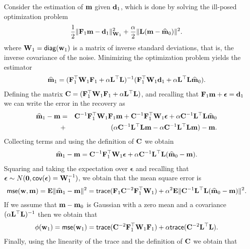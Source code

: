 \documentclass[english]{siamltex}
\newcommand{\bfC}	{{\bf{C}}}
\newcommand{\bfE}	{{\bf{E}}}
\newcommand{\bfF}	{{\bf{F}}}
\newcommand{\bfL}	{{\bf{L}}}
\newcommand{\bfW}	{{\bf{W}}}
\newcommand{\bfd}	{{\bf{d}}}
\newcommand{\bfm}	{{\bf{m}}}
\newcommand{\bfw}	{{\bf{w}}}
\newcommand{\hf}        {{\frac 12}}
\newcommand{\bfepsilon} {{\boldsymbol \epsilon}}
\newcommand{\bfmhat}    {{\widehat{\bfm}}}
\newcommand{\LtL}       { \bfL^{\top}\bfL}
\newcommand {\zero}  { {\bf 0} }
\renewcommand{\hf}		 {\frac12}
\renewcommand{\bfmhat}	{\widehat{\bf m}}
\begin{document}
{Consider  the estimation of $\bfm$ given $\bfd_{1}$, which is done by solving the ill-posed optimization problem
\begin{eqnarray}
\label{mest1}
\hf \| \bfF_{1} \bfm - \bfd_{1}\|^{2}_{\bfW_{1}} + {\frac {\alpha} 2}
\|\bfL (\bfm - \bfmhat_{0}) \|^{2}. 
\end{eqnarray}
where $\bfW_{1} = {\sf diag}(\bfw_{1})$ is a matrix of inverse standard deviations, 
that is, the inverse covariance of the noise.
Minimizing the  optimization problem yields the estimator
\begin{eqnarray}
\label{mest}
\widehat \bfm_{1} = (\bfF_{1}^{\top} \bfW_{1}\bfF_{1} + \alpha \bfL^{\top} \bfL)^{-1} (\bfF_{1}^{\top} \bfW_{1} \bfd_{1}
+ \alpha \LtL \bfmhat_{0}).
\end{eqnarray}
Defining the matrix $\bfC = (\bfF_{1}^{\top} \bfW_{1}\bfF_{1} + \alpha \LtL)$, and recalling that $\bfF_1\bfm + \bfepsilon = \bfd_1$ we can write
the error in the recovery as
\begin{eqnarray}
\bfmhat_1 -\bfm &=& \bfC^{-1} \bfF_{1}^{\top} \bfW_{1}\bfF_{1} \bfm + \bfC^{-1} \bfF_{1}^{\top} \bfW_{1}\bfepsilon + \alpha
\bfC^{-1} \LtL \bfmhat_{0} \\
&+& (\alpha \bfC^{-1} \LtL\bfm
- \alpha \bfC^{-1} \LtL \bfm) 
 -\bfm.
\end{eqnarray}
Collecting terms and using the definition of $\bfC$ we obtain
\begin{eqnarray}
\label{diffmod}
\bfmhat_1 -\bfm = \bfC^{-1} \bfF_{1}^{\top} \bfW_{1} \bfepsilon + \alpha \bfC^{-1} \LtL (\bfmhat_{0} - \bfm).
\end{eqnarray}
Squaring and taking the expectation over $\bfepsilon$ and recalling that $ \bfepsilon \sim N(\zero,{\sf cov}(\bfepsilon) = \bfW_{1}^{-1})$, we obtain that the mean square error is
\begin{eqnarray}
{\sf mse}(\bfw,\bfm) = \bfE\| \bfmhat_1 -\bfm \|^{2} = {\sf trace}(   \bfF_{1} \bfC^{-2} \bfF_{1}^{\top} \bfW_{1})  + 
\alpha^2 \bfE\| \bfC^{-1} \LtL (\bfmhat_{0} - \bfm) \|^{2}.
\end{eqnarray}
If we assume that $\bfm-\bfm_{0}$ is Gaussian with a zero mean and a covariance
$(\alpha \LtL)^{-1}$ then we obtain that
\begin{eqnarray}
\phi(\bfw_1 ) = {\sf mse}(\bfw_1) = {\sf trace}(    \bfC^{-2} \bfF_{1}^{\top}\bfW_{1}\bfF_{1} )  + 
 \alpha {\sf trace} (\bfC^{-2} \LtL) . 
\end{eqnarray}
Finally, using the linearity of the trace and the definition of $\bfC$ we obtain that
\begin{eqnarray}

\end{eqnarray}}
\end{document}
